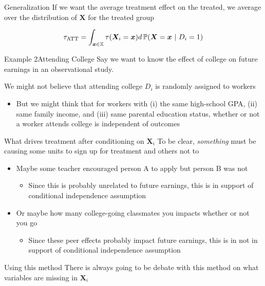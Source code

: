 \documentclass[aspectratio=169,t,11pt,table]{beamer}
\begin{document}
\begin{frame}{Generalization}
  If we want the average treatment effect on the treated, we average over the distribution of $\bm{X}$ for the treated group
  
  \vspace*{-\medskipamount}
  $$
    \tau_{\text{ATT}} = 
    \int_{\bm{x} \in \mathbb{X}} \tau(\bm{X}_i = \bm{x}) d\prob{\bm{X} = \bm{x}}{D_i = 1}
  $$
\end{frame}

\begin{frame}{Example 2}{Attending College}
  Say we want to know the effect of college on future earnings in an observational study. 
  
  \bigskip
  We might not believe that attending college $D_i$ is randomly assigned to workers
  \begin{itemize}
    \item But we might think that for workers with (i) the same high-school GPA, (ii) same family income, and (iii) same parental education status, whether or not a worker attends college is independent of outcomes
  \end{itemize}
\end{frame}

\begin{frame}{What drives treatment after conditioning on $\bm{X}_i$}
  To be clear, \emph{something} must be causing some units to sign up for treatment and others not to
  \begin{itemize}
    \item Maybe some teacher encouraged person A to apply but person B was not 
    \begin{itemize}
      \item Since this is probably unrelated to future earnings, this is in support of conditional independence assumption
    \end{itemize}
    
    \pause
    \item Or maybe how many college-going classmates you impacts whether or not you go
    \begin{itemize}
      \item Since these peer effects probably impact future earnings, this is in not in support of conditional independence assumption
    \end{itemize}
  \end{itemize}
\end{frame}

\begin{frame}{Using this method}
  There is always going to be debate with this method on what variables are missing in $\bm{X}_i$
\end{frame}
\end{document}
